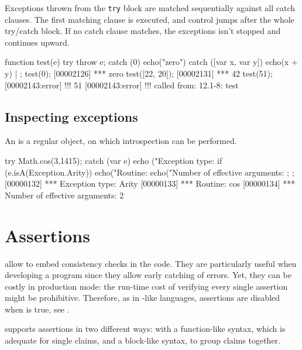Exceptions thrown from the \texttt{try} block are matched sequentially
against all catch clauses. The first matching clause is executed, and
control jumps after the whole try/catch block. If no catch clause
matches, the exceptions isn't stopped and continues
upward.

\begin{urbiscript}
function test(e)
{
  try
  { throw e;  }
  catch (0)
  { echo("zero") }
  catch ([var x, var y])
  { echo(x + y) }
} | {};
test(0);
[00002126] *** zero
test([22, 20]);
[00002131] *** 42
test(51);
[00002143:error] !!! 51
[00002143:error] !!!    called from: 12.1-8: test
\end{urbiscript}

\subsection{Inspecting exceptions}

An  is a regular object, on which introspection
can be performed.

\begin{urbiscript}
try
{
  Math.cos(3,1415);
}
catch (var e)
{
  echo ("Exception type: %
  if (e.isA(Exception.Arity))
  {
    echo("Routine: %
    echo("Number of effective arguments: %
  };
};
[00000132] *** Exception type: Arity
[00000133] *** Routine: cos
[00000134] *** Number of effective arguments: 2
\end{urbiscript}


\section{Assertions}
\label{sec:assertions}

 allow to embed consistency checks in the
code.  They are particularly useful when developing a program since
they allow early catching of errors.  Yet, they can be costly in
production mode: the run-time cost of verifying every single assertion
might be prohibitive.  Therefore, as in \C-like languages, assertions
are disabled when  is true, see .

\us supports assertions in two different ways: with a function-like
syntax, which is adequate for single claims, and a block-like syntax,
to group claims together.


